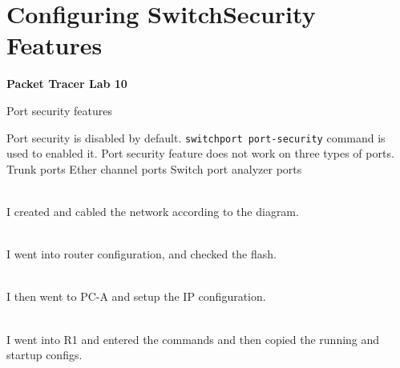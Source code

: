\documentclass[../EngineeringJournal_CDavis.tex]{subfiles}
\begin{document}

\chapter[Configuring Switch Security]{Configuring Switch\linebreak[1] 
Security Features\hspace*{\fill February 26, 2020}}
\noindent\textbf{{Packet Tracer Lab 10} }                             


\hspace{0.2cm}
\begin{tcolorbox}[width=6.3in]
Port security features
\scriptsize 
\begin{outline}
  \1 Port security is disabled by default. 
    \2 {\verb$switchport port-security$} command is used to enabled it.
  \1 Port security feature does not work on three types of ports.
    \2 Trunk ports
    \2 Ether channel ports
    \2 Switch port analyzer ports
\end{outline}
\end{tcolorbox}
\hspace{0.2cm}
\normalsize  
  

\clearpage


\\
I created and cabled the network according to the diagram.


\noindent{}\\
I went into router configuration, and checked the flash.


\noindent{}\\
I then went to PC-A and setup the IP configuration.

\noindent{}\\
I went into R1 and entered the commands and then copied the running and
startup configs.
\end{document}
